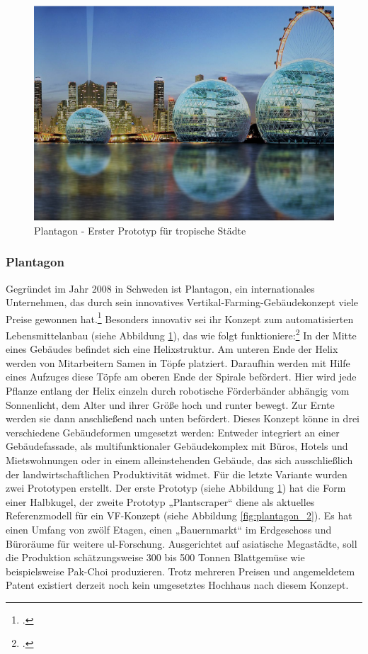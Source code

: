 \documentclass{scrartcl}
\begin{document}
\begin{figure}[htbp]
    \centering
    \includegraphics[width=12cm]{image_folder/plantagon.png}
  \caption{Plantagon - Erster Prototyp für tropische Städte}
  \label{fig:plantagon}
\end{figure} 

\subsubsection{Plantagon}

Gegründet im Jahr 2008 in Schweden ist Plantagon, ein internationales Unternehmen, das durch sein innovatives Vertikal-Farming-Gebäudekonzept viele Preise gewonnen hat.\footcite[Vgl.]{PlantagonAwardsPlantagon} Besonders innovativ sei ihr Konzept zum automatisierten Lebensmittelanbau (siehe Abbildung \ref{fig:plantagon}), das wie folgt funktioniere:\footcite[Vgl.][S.21f]{Al-Kodmany2018TheCity}  In der Mitte eines Gebäudes befindet sich eine Helixstruktur. Am unteren Ende der Helix werden von Mitarbeitern Samen in Töpfe platziert. Daraufhin werden mit Hilfe eines Aufzuges diese Töpfe am oberen Ende der Spirale befördert. Hier wird jede Pflanze entlang der Helix einzeln durch robotische Förderbänder abhängig vom Sonnenlicht, dem Alter und ihrer Größe hoch und runter bewegt. Zur Ernte werden sie dann anschließend nach unten befördert. Dieses Konzept könne in drei verschiedene Gebäudeformen umgesetzt werden: Entweder integriert an einer Gebäudefassade, als multifunktionaler Gebäudekomplex mit Büros, Hotels und Mietswohnungen oder in einem alleinstehenden Gebäude, das sich ausschließlich der landwirtschaftlichen Produktivität widmet. Für die letzte Variante wurden zwei Prototypen erstellt. Der erste Prototyp (siehe Abbildung \ref{fig:plantagon}) hat die Form einer Halbkugel, der zweite Prototyp „Plantscraper“ diene als aktuelles Referenzmodell für ein VF-Konzept (siehe Abbildung \ref{fig:plantagon_2}). Es hat einen Umfang von zwölf Etagen, einen „Bauernmarkt“ im Erdgeschoss und Büroräume für weitere \acs{ul}-Forschung. Ausgerichtet auf asiatische Megastädte, soll die Produktion schätzungsweise 300 bis 500 Tonnen Blattgemüse wie beispielsweise Pak-Choi produzieren. Trotz mehreren Preisen und angemeldetem Patent existiert derzeit noch kein umgesetztes Hochhaus nach diesem Konzept.
\end{document}
